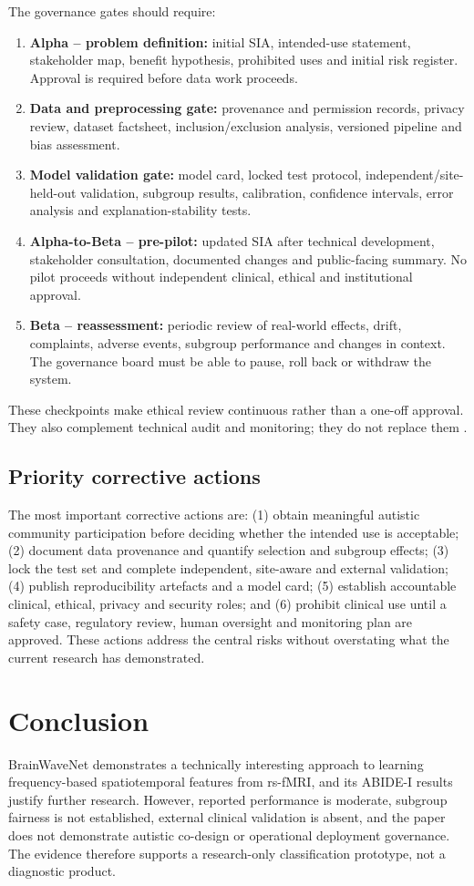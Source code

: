 \documentclass[11pt,a4paper]{article}
\begin{document}
The governance gates should require:
\begin{enumerate}
\item \textbf{Alpha -- problem definition:} initial SIA, intended-use statement, stakeholder map, benefit hypothesis, prohibited uses and initial risk register. Approval is required before data work proceeds.
\item \textbf{Data and preprocessing gate:} provenance and permission records, privacy review, dataset factsheet, inclusion/exclusion analysis, versioned pipeline and bias assessment.
\item \textbf{Model validation gate:} model card, locked test protocol, independent/site-held-out validation, subgroup results, calibration, confidence intervals, error analysis and explanation-stability tests.
\item \textbf{Alpha-to-Beta -- pre-pilot:} updated SIA after technical development, stakeholder consultation, documented changes and public-facing summary. No pilot proceeds without independent clinical, ethical and institutional approval.
\item \textbf{Beta -- reassessment:} periodic review of real-world effects, drift, complaints, adverse events, subgroup performance and changes in context. The governance board must be able to pause, roll back or withdraw the system.
\end{enumerate}
These checkpoints make ethical review continuous rather than a one-off approval. They also complement technical audit and monitoring; they do not replace them \parencite{leslie2019,raji2020}.

\subsection{Priority corrective actions}
The most important corrective actions are: (1) obtain meaningful autistic community participation before deciding whether the intended use is acceptable; (2) document data provenance and quantify selection and subgroup effects; (3) lock the test set and complete independent, site-aware and external validation; (4) publish reproducibility artefacts and a model card; (5) establish accountable clinical, ethical, privacy and security roles; and (6) prohibit clinical use until a safety case, regulatory review, human oversight and monitoring plan are approved. These actions address the central risks without overstating what the current research has demonstrated.

\section{Conclusion}
BrainWaveNet demonstrates a technically interesting approach to learning frequency-based spatiotemporal features from rs-fMRI, and its ABIDE-I results justify further research. However, reported performance is moderate, subgroup fairness is not established, external clinical validation is absent, and the paper does not demonstrate autistic co-design or operational deployment governance. The evidence therefore supports a research-only classification prototype, not a diagnostic product.
\end{document}
